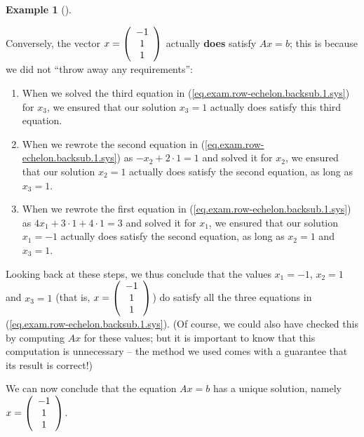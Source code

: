 \documentclass[numbers=enddot,12pt,final,onecolumn,notitlepage]{scrartcl}%
\theoremstyle{definition}
\newtheorem{exam}[theo]{Example}
\newenvironment{example}[1][]
{\begin{exam}[#1]\begin{leftbar}}
{\end{leftbar}\end{exam}}
\begin{document}
\begin{example}
Conversely, the vector $x=\left(
\begin{array}
[c]{c}%
-1\\
1\\
1
\end{array}
\right)  $ actually \textbf{does} satisfy $Ax=b$; this is because we did not
\textquotedblleft throw away any requirements\textquotedblright:

\begin{enumerate}
\item When we solved the third equation in
(\ref{eq.exam.row-echelon.backsub.1.sys}) for $x_{3}$, we ensured that our
solution $x_{3}=1$ actually does satisfy this third equation.

\item When we rewrote the second equation in
(\ref{eq.exam.row-echelon.backsub.1.sys}) as $-x_{2}+2\cdot1=1$ and solved it
for $x_{2}$, we ensured that our solution $x_{2}=1$ actually does satisfy the
second equation, as long as $x_{3}=1$.

\item When we rewrote the first equation in
(\ref{eq.exam.row-echelon.backsub.1.sys}) as $4x_{1}+3\cdot1+4\cdot1=3$ and
solved it for $x_{1}$, we ensured that our solution $x_{1}=-1$ actually does
satisfy the second equation, as long as $x_{2}=1$ and $x_{3}=1$.
\end{enumerate}

Looking back at these steps, we thus conclude that the values $x_{1}=-1$,
$x_{2}=1$ and $x_{3}=1$ (that is, $x=\left(
\begin{array}
[c]{c}%
-1\\
1\\
1
\end{array}
\right)  $) do satisfy all the three equations in
(\ref{eq.exam.row-echelon.backsub.1.sys}). (Of course, we could also have
checked this by computing $Ax$ for these values; but it is important to know
that this computation is unnecessary -- the method we used comes with a
guarantee that its result is correct!)

We can now conclude that the equation $Ax=b$ has a unique solution, namely
$x=\left(
\begin{array}
[c]{c}%
-1\\
1\\
1
\end{array}
\right)  $.
\end{example}
\end{document}
